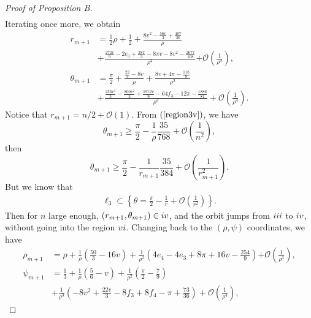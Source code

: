 \documentclass{article}
\def \Rthree{\uppercase\expandafter{\romannumeral3}}
\def \Rfour{\uppercase\expandafter{\romannumeral4}}
\def \Rsix{\uppercase\expandafter{\romannumeral6}}
\numberwithin{figure}{section}
\numberwithin{equation}{section}
\theoremstyle{remark}
\theoremstyle{definition}
\begin{document}
\begin{proof}[Proof of Proposition B]
\begin{equation}
\begin{split}
		\end{split}
	\end{equation}
 Iterating once more, we obtain
 \begin{equation}
		\begin{split}
			r_{m + 1}& = \frac{1}{2}\rho + \frac{1}{2} + \frac{8v^2-\frac{56v}{3}+\frac{407}{36}}{\rho}\\ 
            &+ \frac{\frac{272v}{9}-2e_3 +\frac{28\pi }{3}-8\pi v-8v^2 -\frac{2677}{108}}{\rho^{2}}\mathcal{+ O}\left( \frac{1}{\rho^{3}} \right),\\
			\theta_{m + 1} &= \frac{\pi}{2} + \frac{\frac{22}{3} - 8v}{\rho} + \frac{8v+4\pi -\frac{118}{9}}{\rho^{2}} \\
            &+ \frac{\frac{256v^3 }{3}-\frac{800v^2 }{3}+\frac{1972v}{9}-64f_3 -12\pi -\frac{1886}{81}}{\rho^{3}} + \mathcal{O}\left( \frac{1}{\rho^{4}} \right).
		\end{split}
	\end{equation}
Notice that $r_{m+1} =n/2+\mathcal{O}(1)$. From $(\ref{region3v})$, we have
\begin{equation*}
    \theta_{m+1}\geq \frac{\pi}{2}-\frac{1}{\rho}\frac{35}{768}+\mathcal{O}\left(\frac{1}{n^2}\right),
\end{equation*}
then
\begin{equation*}
    \theta_{m+1}\geq \frac{\pi}{2}-\frac{1}{r_{m+1}}\frac{35}{384}+\mathcal{O}\left(\frac{1}{r_{m+1}^2}\right).
\end{equation*}
But we know that
\begin{align}
		\ell_{3} \subset \left\{ \theta=\frac{\pi}{2}-\frac{1}{r}+\mathcal{O}\left(\frac{1}{r^2}\right)\right\}.
	\end{align}
Then for $n$ large enough, $(r_{m+1},\theta_{m+1})\in\Rfour$, and the orbit jumps from $\Rthree$ to $\Rfour$, without going into the region $\Rsix$.
Changing back to the $(\rho,\psi)$ coordinates, we have
\begin{equation}
\begin{split}
			\rho_{m+1} &= \rho + \frac{1}{\rho}\left(\frac{50}{3}-16v\right) + \frac{1}{\rho^{2}}\left(4e_4-4e_3+8\pi+16v-\frac{254}{9}\right)\mathcal{+ O}\left( \frac{1}{\rho^{3}} \right),\\
			\psi_{m+1}& = \frac{1}{3} + \frac{1}{\rho}\left(\frac{5}{6} - v\right) + \frac{1}{\rho^{2}}\left(\frac{\pi}{2}-\frac{7}{9}\right) \\
            &+ \frac{1}{\rho^{3}}\left(-8v^2+\frac{22v}{3}-8f_3+8f_4-\pi+\frac{73}{36}\right) + \mathcal{O}\left( \frac{1}{\rho^{4}} \right),

\end{split}
\end{equation}
\end{proof}
\end{document}
